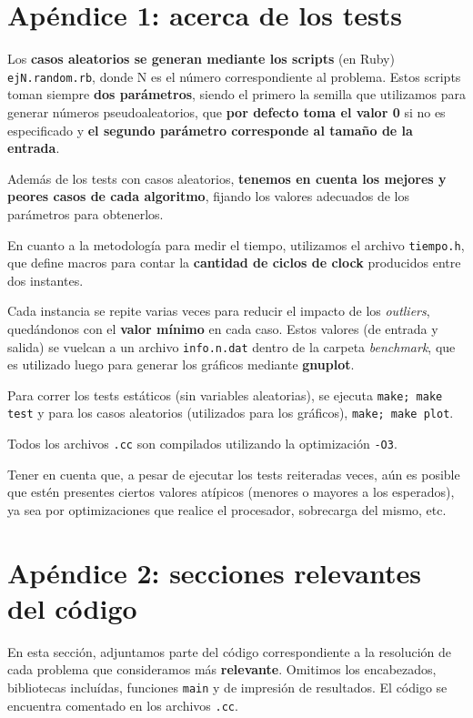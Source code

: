 \documentclass[a4paper]{article}
\begin{document}
\section{Apéndice 1: acerca de los tests}

Los \textbf{casos aleatorios se generan mediante los scripts} (en Ruby) \verb|ejN.random.rb|, donde
N es el número correspondiente al problema. Estos scripts toman siempre \textbf{dos parámetros},
siendo el primero la semilla que utilizamos para generar números pseudoaleatorios, que
\textbf{por defecto toma el valor 0} si no es especificado y \textbf{el segundo parámetro corresponde
al tamaño de la entrada}.

Además de los tests con casos aleatorios, \textbf{tenemos en cuenta los mejores y peores
casos de cada algoritmo}, fijando los valores adecuados de los parámetros para
obtenerlos. \medskip

En cuanto a la metodología para medir el tiempo, utilizamos el archivo \verb|tiempo.h|,
que define macros para contar la \textbf{cantidad de ciclos de clock} producidos entre dos instantes. \medskip

Cada instancia se repite varias veces para reducir el impacto de los \textit{outliers}, quedándonos
con el \textbf{valor mínimo} en cada caso. Estos valores (de entrada y salida) se vuelcan a un archivo
\verb|info.n.dat| dentro de la carpeta \textit{benchmark}, que es utilizado luego para generar los gráficos
mediante \textbf{gnuplot}. \medskip

Para correr los tests estáticos (sin variables aleatorias), se ejecuta \verb|make; make test| y para los
casos aleatorios (utilizados para los gráficos), \verb|make; make plot|.

Todos los archivos \verb|.cc| son compilados utilizando la optimización \verb|-O3|. \medskip

Tener en cuenta que, a pesar de ejecutar los tests reiteradas veces, aún es posible que estén presentes ciertos
valores atípicos (menores o mayores a los esperados), ya sea por optimizaciones que realice el procesador, sobrecarga
del mismo, etc.
\newpage

\section{Apéndice 2: secciones relevantes del código}

En esta sección, adjuntamos parte del código correspondiente a la resolución de cada problema que consideramos más \textbf{relevante}. Omitimos los encabezados, bibliotecas incluídas, funciones \verb|main| y de impresión de resultados. El código se encuentra comentado en los archivos \verb|.cc|.
\end{document}
